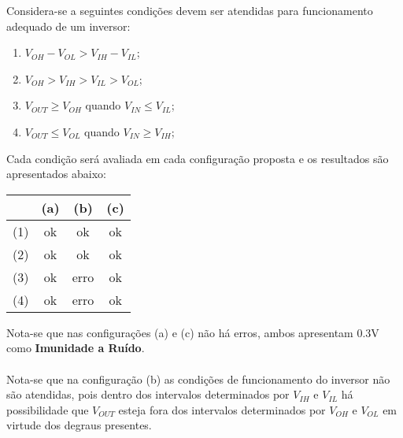 \documentclass{article}
\begin{document}
            \begin{resolution}
                Considera-se a seguintes condições devem ser atendidas para funcionamento adequado de um inversor:
                    \begin{enumerate}[noitemsep]
                        \item $V_{OH} - V_{OL} > V_{IH} - V_{IL}$;
                        \item $V_{OH} > V_{IH} > V_{IL} > V_{OL}$;
                        \item $V_{OUT} \ge V_{OH}$ quando $V_{IN} \le V_{IL}$;
                        \item $V_{OUT} \le V_{OL}$ quando $V_{IN} \ge V_{IH}$;
                    \end{enumerate}
                Cada condição será avaliada em cada configuração proposta e os resultados são apresentados abaixo:
                    \begin{table}[H]
                        \centering  
                        \begin{tabular}[]{l ccc}\hline
                                & (a) & (b)  & (c)\\\hline
                            (1) & ok  & ok   & ok\\
                            (2) & ok  & ok   & ok\\
                            (3) & ok  & erro & ok\\
                            (4) & ok  & erro & ok\\\hline
                        \end{tabular}
                    \end{table}
                Nota-se que nas configurações (a) e (c) não há erros, ambos apresentam 0.3V como \textbf{Imunidade a Ruído}.\\\\
                Nota-se que na configuração (b) as condições de funcionamento do inversor não são atendidas, pois dentro dos intervalos determinados por $V_{IH}$ e $V_{IL}$ há possibilidade que $V_{OUT}$ esteja fora dos intervalos determinados por $V_{OH}$ e $V_{OL}$ em virtude dos degraus presentes.
            \end{resolution}

\newpage
\end{document}
